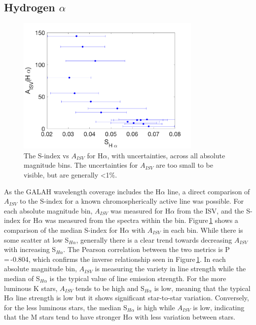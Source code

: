 \subsection{Hydrogen $\alpha$}
\label{secGALAHhalpha}
\begin{figure}
    \centering
	\captionsetup{width=.8\textwidth}
	\includegraphics[width=0.8\textwidth]{GALAH_Ha_S_I.png}
	\caption{The S-index vs $A_{ISV}$ for H$\alpha$, with uncertainties, across all absolute magnitude bins. The uncertainties for $A_{ISV}$ are too small to be visible, but are generally \textless1\%.}
	\label{figGALAHhalpha}
\end{figure}

As the GALAH wavelength coverage includes the H$\alpha$ line, a direct comparison of $A_{ISV}$ to the S-index for a known chromospherically active line was possible. For each absolute magnitude bin, $A_{ISV}$ was measured for H$\alpha$ from the ISV, and the S-index for H$\alpha$ was measured from the spectra within the bin. Figure\,\ref{figGALAHhalpha} shows a comparison of the median S-index for H$\alpha$ with $A_{ISV}$ in each bin. While there is some scatter at low S$_{H\alpha}$, generally there is a clear trend towards decreasing  $A_{ISV}$ with increasing S$_{H\alpha}$. The Pearson correlation between the two metrics is P\,=\,-0.804, which confirms the inverse relationship seen in Figure\,\ref{figGALAHhalpha}. In each absolute magnitude bin, $A_{ISV}$ is measuring the variety in line strength while the median of S$_{H\alpha}$ is the typical value of line emission strength. For the more luminous K stars, $A_{ISV}$ tends to be high and S$_{H\alpha}$ is low, meaning that the typical H$\alpha$ line strength is low but it shows significant star-to-star variation. Conversely, for the less luminous stars, the median S$_{H\alpha}$ is high while $A_{ISV}$ is low, indicating that the M stars tend to have stronger H$\alpha$ with less variation between stars.

